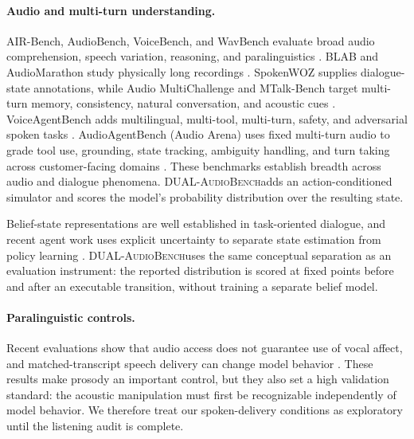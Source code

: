 \documentclass{article}
\newcommand{\benchmark}{\textsc{DUAL-AudioBench}}
\begin{document}
\paragraph{Audio and multi-turn understanding.}
AIR-Bench, AudioBench, VoiceBench, and WavBench evaluate broad audio comprehension, speech variation, reasoning, and paralinguistics \citep{yang2024airbench,wang2024audiobench,chen2024voicebench,li2026wavbench}. BLAB and AudioMarathon study physically long recordings \citep{ahia2025blab,he2025audiomarathon}. SpokenWOZ supplies dialogue-state annotations, while Audio MultiChallenge and MTalk-Bench target multi-turn memory, consistency, natural conversation, and acoustic cues \citep{si2023spokenwoz,gosa2025audiomultichallenge,du2025mtalk}. VoiceAgentBench adds multilingual, multi-tool, multi-turn, safety, and adversarial spoken tasks \citep{jain2025voiceagentbench}. AudioAgentBench (Audio Arena) uses fixed multi-turn audio to grade tool use, grounding, state tracking, ambiguity handling, and turn taking across customer-facing domains \citep{arcadalabs2026audioarena}. These benchmarks establish breadth across audio and dialogue phenomena. \benchmark adds an action-conditioned simulator and scores the model's probability distribution over the resulting state.

Belief-state representations are well established in task-oriented dialogue, and recent agent work uses explicit uncertainty to separate state estimation from policy learning \citep{si2023spokenwoz,singh2026agentbrace}. \benchmark uses the same conceptual separation as an evaluation instrument: the reported distribution is scored at fixed points before and after an executable transition, without training a separate belief model.

\paragraph{Paralinguistic controls.}
Recent evaluations show that audio access does not guarantee use of vocal affect, and matched-transcript speech delivery can change model behavior \citep{ayllon2026voiceeq,qian2026pjbreak}. These results make prosody an important control, but they also set a high validation standard: the acoustic manipulation must first be recognizable independently of model behavior. We therefore treat our spoken-delivery conditions as exploratory until the listening audit is complete.
\end{document}
